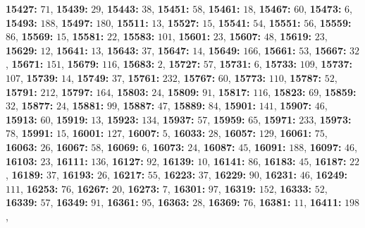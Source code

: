 \textsf{\bfseries 15427:} $71$, \textsf{\bfseries 15439:} $29$, \textsf{\bfseries 15443:} $38$, \textsf{\bfseries 15451:} $58$, \textsf{\bfseries 15461:} $18$, \textsf{\bfseries 15467:} $60$, \textsf{\bfseries 15473:} $6$, \textsf{\bfseries 15493:} $188$, \textsf{\bfseries 15497:} $180$, \textsf{\bfseries 15511:} $13$, \textsf{\bfseries 15527:} $15$, \textsf{\bfseries 15541:} $54$, \textsf{\bfseries 15551:} $56$, \textsf{\bfseries 15559:} $86$, \textsf{\bfseries 15569:} $15$, \textsf{\bfseries 15581:} $22$, \textsf{\bfseries 15583:} $101$, \textsf{\bfseries 15601:} $23$, \textsf{\bfseries 15607:} $48$, \textsf{\bfseries 15619:} $23$, \textsf{\bfseries 15629:} $12$, \textsf{\bfseries 15641:} $13$, \textsf{\bfseries 15643:} $37$, \textsf{\bfseries 15647:} $14$, \textsf{\bfseries 15649:} $166$, \textsf{\bfseries 15661:} $53$, \textsf{\bfseries 15667:} $32$, \textsf{\bfseries 15671:} $151$, \textsf{\bfseries 15679:} $116$, \textsf{\bfseries 15683:} $2$, \textsf{\bfseries 15727:} $57$, \textsf{\bfseries 15731:} $6$, \textsf{\bfseries 15733:} $109$, \textsf{\bfseries 15737:} $107$, \textsf{\bfseries 15739:} $14$, \textsf{\bfseries 15749:} $37$, \textsf{\bfseries 15761:} $232$, \textsf{\bfseries 15767:} $60$, \textsf{\bfseries 15773:} $110$, \textsf{\bfseries 15787:} $52$, \textsf{\bfseries 15791:} $212$, \textsf{\bfseries 15797:} $164$, \textsf{\bfseries 15803:} $24$, \textsf{\bfseries 15809:} $91$, \textsf{\bfseries 15817:} $116$, \textsf{\bfseries 15823:} $69$, \textsf{\bfseries 15859:} $32$, \textsf{\bfseries 15877:} $24$, \textsf{\bfseries 15881:} $99$, \textsf{\bfseries 15887:} $47$, \textsf{\bfseries 15889:} $84$, \textsf{\bfseries 15901:} $141$, \textsf{\bfseries 15907:} $46$, \textsf{\bfseries 15913:} $60$, \textsf{\bfseries 15919:} $13$, \textsf{\bfseries 15923:} $134$, \textsf{\bfseries 15937:} $57$, \textsf{\bfseries 15959:} $65$, \textsf{\bfseries 15971:} $233$, \textsf{\bfseries 15973:} $78$, \textsf{\bfseries 15991:} $15$, \textsf{\bfseries 16001:} $127$, \textsf{\bfseries 16007:} $5$, \textsf{\bfseries 16033:} $28$, \textsf{\bfseries 16057:} $129$, \textsf{\bfseries 16061:} $75$, \textsf{\bfseries 16063:} $26$, \textsf{\bfseries 16067:} $58$, \textsf{\bfseries 16069:} $6$, \textsf{\bfseries 16073:} $24$, \textsf{\bfseries 16087:} $45$, \textsf{\bfseries 16091:} $188$, \textsf{\bfseries 16097:} $46$, \textsf{\bfseries 16103:} $23$, \textsf{\bfseries 16111:} $136$, \textsf{\bfseries 16127:} $92$, \textsf{\bfseries 16139:} $10$, \textsf{\bfseries 16141:} $86$, \textsf{\bfseries 16183:} $45$, \textsf{\bfseries 16187:} $22$, \textsf{\bfseries 16189:} $37$, \textsf{\bfseries 16193:} $26$, \textsf{\bfseries 16217:} $55$, \textsf{\bfseries 16223:} $37$, \textsf{\bfseries 16229:} $90$, \textsf{\bfseries 16231:} $46$, \textsf{\bfseries 16249:} $111$, \textsf{\bfseries 16253:} $76$, \textsf{\bfseries 16267:} $20$, \textsf{\bfseries 16273:} $7$, \textsf{\bfseries 16301:} $97$, \textsf{\bfseries 16319:} $152$, \textsf{\bfseries 16333:} $52$, \textsf{\bfseries 16339:} $57$, \textsf{\bfseries 16349:} $91$, \textsf{\bfseries 16361:} $95$, \textsf{\bfseries 16363:} $28$, \textsf{\bfseries 16369:} $76$, \textsf{\bfseries 16381:} $11$, \textsf{\bfseries 16411:} $198$, 
